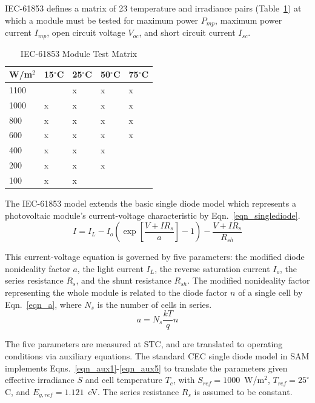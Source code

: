 \documentclass[12pt,letterpaper]{article}
\begin{document}
IEC-61853 defines a matrix of 23 temperature and irradiance pairs (Table~\ref{tab_testmatrix}) at which a module must be tested for maximum power $P_{mp}$, maximum power current $I_{mp}$, open circuit voltage $V_{oc}$, and short circuit current $I_{sc}$. 

\begin{table}[h!]
\begin{center}
\begin{tabular}{lllll}
 W/m$^2$ & 15$^\circ$C & 25$^\circ$C & 50$^\circ$C & 75$^\circ$C \\
\hline
1100 & & x & x & x \\
1000 & x & x & x & x \\
800 & x & x & x & x \\
600 & x & x & x & x \\
400 & x & x & x &  \\
200 & x & x & x &  \\
100 & x & x &  &  \\
\end{tabular}
\caption{IEC-61853 Module Test Matrix}
\label{tab_testmatrix}
\end{center}
\end{table}

The IEC-61853 model extends the basic single diode model which represents a photovoltaic module's current-voltage characteristic by Eqn.~\ref{eqn_singlediode}.
\begin{equation}
I = I_L - I_o\left(\exp \left[\frac{V+IR_s}{a}\right]-1\right) - \frac{V+IR_s}{R_{sh}}
\label{eqn_singlediode}
\end{equation}

This current-voltage equation is governed by five parameters: the modified diode nonideality factor $a$, the light current $I_L$, the reverse saturation current $I_o$, the series resistance $R_s$, and the shunt resistance $R_{sh}$.  The modified nonideality factor representing the whole module is related to the diode factor $n$ of a single cell by Eqn.~\ref{eqn_a}, where $N_s$ is the number of cells in series.
\begin{equation}\label{eqn_a}
a = N_s\frac{kT}{q}n
\end{equation}

The five parameters are measured at STC, and are translated to operating conditions via auxiliary equations.  The standard CEC single diode model in SAM implements Eqns.~\ref{eqn_aux1}-\ref{eqn_aux5} to translate the parameters given effective irradiance $S$ and cell temperature $T_c$, with $S_{ref}=1000$~W/m$^2$, $T_{ref}=25^\circ$C, and $E_{g,ref} = 1.121$~eV.  The series resistance $R_s$ is assumed to be constant.
\end{document}
